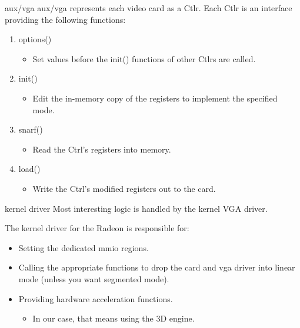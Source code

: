 \documentclass[xcolor=dvipsnames]{beamer}
\begin{document}
\begin{frame}[t]{aux/vga}
	aux/vga represents each video card as a Ctlr. Each Ctlr is an interface providing the following functions:
	\begin{enumerate}
		\pause
		\item options()
		\begin{itemize}
			\item Set values before the init() functions of other Ctlrs are called.
		\end{itemize}

		\pause
		\item init()
		\begin{itemize}
			\item Edit the in-memory copy of the registers to implement the specified mode.
		\end{itemize}
		
		\pause
		\item snarf()
		\begin{itemize}
			\item Read the Ctrl's registers into memory.
		\end{itemize}

		\pause
		\item load()
		\begin{itemize}
			\item Write the Ctrl's modified registers out to the card.
		\end{itemize}
	\end{enumerate}
\end{frame}


\begin{frame}[t]{kernel driver}
	Most interesting logic is handled by the kernel VGA driver.

	The kernel driver for the Radeon is responsible for:
	\begin{itemize}
		\pause
		\item Setting the dedicated mmio regions.
		\pause
		\item Calling the appropriate functions to drop the card and vga driver into linear mode (unless you want segmented mode).
		\pause
		\item Providing hardware acceleration functions.
		\begin{itemize}
			\item In our case, that means using the 3D engine.
		\end{itemize}
	\end{itemize}
\end{frame}
\end{document}
